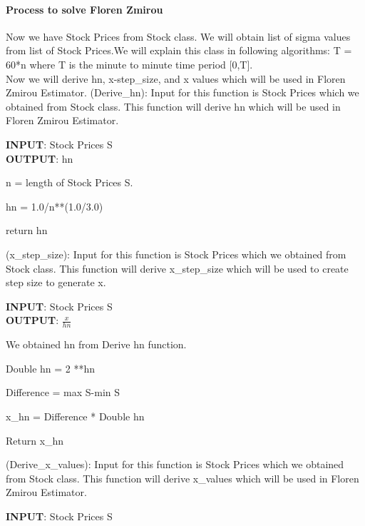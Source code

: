 \begin{enumerate}
\paragraph{Process to solve Floren Zmirou}
Now we have Stock Prices from Stock class. We will obtain list of sigma values from list of Stock Prices.We will explain this class in following algorithms:\newline
T = 60*n where T is the minute to minute time period [0,T].\\
Now we will derive hn, x-step\_size, and x values which will be used in Floren Zmirou Estimator.
  (Derive_hn): Input for this function is Stock Prices which we obtained from Stock class.
  This function will derive hn which will be used in Floren Zmirou Estimator.
  \begin{algorithm}
  \caption{Derive hn}
  \bigskip
  \textbf{INPUT}: Stock Prices S\\
  \textbf{OUTPUT}: hn
  \begin{algorithmic}[1]
  \item n = length of Stock Prices S.
  \item hn = 1.0/n**(1.0/3.0)
  \item return hn
  \end{algorithmic}
  \end{algorithm}
  (x_step_size): Input for this function is Stock Prices which we obtained from Stock class.
  This function will derive x\_step\_size which will be used  to create step size to generate x.
  \begin{algorithm}
  \caption{x\_hn = x step size}
  \bigskip
  \textbf{INPUT}: Stock Prices S\\
  \textbf{OUTPUT}: $\frac{x}{hn}$
  \begin{algorithmic}[1]
  \item We obtained hn from Derive hn function.
  \item Double hn = 2 **hn
  \item Difference = max S-min S
  \item x\_hn = Difference * Double hn
  \item Return x\_hn
  \end{algorithmic}
  \end{algorithm}
  (Derive_x_values): Input for this function is Stock Prices which we obtained from Stock class.
  This function will derive x\_values which will be used  in Floren Zmirou Estimator.
  \begin{algorithm}
  \caption{Derive x Values}
  \bigskip
  \textbf{INPUT}: Stock Prices S\\

\end{algorithm}
\end{enumerate}
